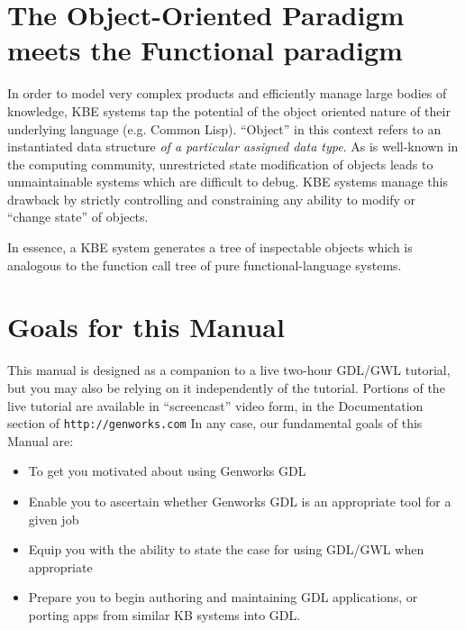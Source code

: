 \documentclass [11pt]{book}
\begin{document}
\section{The Object-Oriented Paradigm meets the Functional paradigm}

\label{sec:theobject-orientedparadigmmeetsthefunctionalparadigm}

In order to model very complex products and efficiently manage
large bodies of knowledge, KBE systems tap the potential of the object
oriented nature of their underlying language (e.g. Common
Lisp). ``Object'' in this context refers to an instantiated data
structure \emph{of a particular assigned data type}. As is well-known in the computing community, unrestricted state
modification of objects leads to unmaintainable systems which are
difficult to debug. KBE systems manage this drawback by strictly
controlling and constraining any ability to modify or ``change state''
of objects.

In essence, a KBE system generates a tree of inspectable objects which
is analogous to the function call tree of pure functional-language
systems.

\section{Goals for this Manual}

\label{sec:goalsforthismanual}

This manual is designed as a companion to a live two-hour
GDL/GWL tutorial, but you may also be relying on it independently of
the tutorial. Portions of the live tutorial are available in
``screencast'' video form, in the Documentation section of \texttt{http://genworks.com} In any case, our fundamental goals of this Manual are:

\begin{itemize}

\item To get you motivated about using Genworks GDL

\item Enable you to ascertain whether Genworks GDL is an appropriate tool for a given job

\item Equip you with the ability to state the case for using GDL/GWL when appropriate

\item Prepare you to begin authoring and maintaining GDL
applications, or porting apps from similar KB systems into GDL.

\end{itemize}
\end{document}
